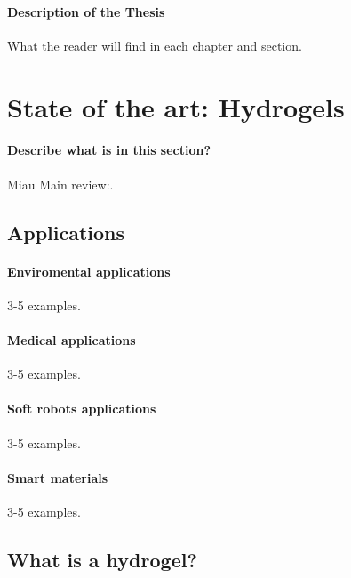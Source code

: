 \paragraph{Description of the Thesis} What the reader will find in each chapter and section.


\section{State of the art: Hydrogels}\label{ch1:StateArt}


\paragraph{Describe what is in this section?} Miau
Main review:\citep{guPolymerNetworksPlastics2020,sheikoArchitecturalCodeRubber2019}.

\subsection{Applications}

\paragraph{Enviromental applications} 3-5 examples.

\paragraph{Medical applications} 3-5 examples.

\paragraph{Soft robots applications} 3-5 examples.

\paragraph{Smart materials} 3-5 examples.



\subsection{What is a hydrogel?}

